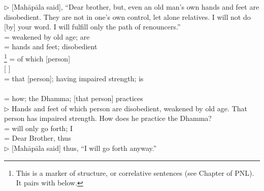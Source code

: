 \normalsize
$\triangleright$ [Mah\=ap\=ala said], ``Dear brother, but, even an old man's own hands and feet are disobedient. They are not in one's own control, let alone relatives. I will not do [by] your word. I will fulfill only the path of renouncers.''\\[1.5mm]
\small
{}  = weakened by old age; are\\[0.5mm]
  = hands and feet; disobedient\\[0.5mm]
\footnote{This is a marker of  structure, or correlative sentences (see Chapter  of PNL). It pairs with  below.} = of which [person]\\[0.5mm]
  [  ]\\[0.5mm]
= that [person]; having impaired strength; is\\[0.5mm]
  \\[0.5mm]
= how; the Dhamma; [that person] practices\\[0.5mm]
\normalsize
$\triangleright$ Hands and feet of which person are disobedient, weakened by old age. That person has impaired strength. How does he practice the Dhamma?\\[1.5mm]
\small
{}  = will only go forth; I\\[0.5mm]
  = Dear Brother, thus\\[1mm]
\normalsize
$\triangleright$ [Mah\=ap\=ala said] thus, ``I will go forth anyway.''\\[1.5mm]
